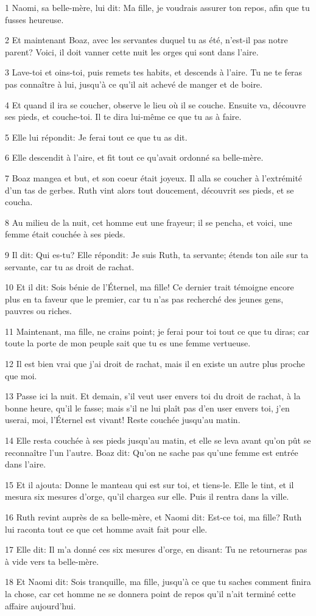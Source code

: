 \par 1 Naomi, sa belle-mère, lui dit: Ma fille, je voudrais assurer ton repos, afin que tu fusses heureuse.
\par 2 Et maintenant Boaz, avec les servantes duquel tu as été, n'est-il pas notre parent? Voici, il doit vanner cette nuit les orges qui sont dans l'aire.
\par 3 Lave-toi et oins-toi, puis remets tes habits, et descends à l'aire. Tu ne te feras pas connaître à lui, jusqu'à ce qu'il ait achevé de manger et de boire.
\par 4 Et quand il ira se coucher, observe le lieu où il se couche. Ensuite va, découvre ses pieds, et couche-toi. Il te dira lui-même ce que tu as à faire.
\par 5 Elle lui répondit: Je ferai tout ce que tu as dit.
\par 6 Elle descendit à l'aire, et fit tout ce qu'avait ordonné sa belle-mère.
\par 7 Boaz mangea et but, et son coeur était joyeux. Il alla se coucher à l'extrémité d'un tas de gerbes. Ruth vint alors tout doucement, découvrit ses pieds, et se coucha.
\par 8 Au milieu de la nuit, cet homme eut une frayeur; il se pencha, et voici, une femme était couchée à ses pieds.
\par 9 Il dit: Qui es-tu? Elle répondit: Je suis Ruth, ta servante; étends ton aile sur ta servante, car tu as droit de rachat.
\par 10 Et il dit: Sois bénie de l'Éternel, ma fille! Ce dernier trait témoigne encore plus en ta faveur que le premier, car tu n'as pas recherché des jeunes gens, pauvres ou riches.
\par 11 Maintenant, ma fille, ne crains point; je ferai pour toi tout ce que tu diras; car toute la porte de mon peuple sait que tu es une femme vertueuse.
\par 12 Il est bien vrai que j'ai droit de rachat, mais il en existe un autre plus proche que moi.
\par 13 Passe ici la nuit. Et demain, s'il veut user envers toi du droit de rachat, à la bonne heure, qu'il le fasse; mais s'il ne lui plaît pas d'en user envers toi, j'en userai, moi, l'Éternel est vivant! Reste couchée jusqu'au matin.
\par 14 Elle resta couchée à ses pieds jusqu'au matin, et elle se leva avant qu'on pût se reconnaître l'un l'autre. Boaz dit: Qu'on ne sache pas qu'une femme est entrée dans l'aire.
\par 15 Et il ajouta: Donne le manteau qui est sur toi, et tiens-le. Elle le tint, et il mesura six mesures d'orge, qu'il chargea sur elle. Puis il rentra dans la ville.
\par 16 Ruth revint auprès de sa belle-mère, et Naomi dit: Est-ce toi, ma fille? Ruth lui raconta tout ce que cet homme avait fait pour elle.
\par 17 Elle dit: Il m'a donné ces six mesures d'orge, en disant: Tu ne retourneras pas à vide vers ta belle-mère.
\par 18 Et Naomi dit: Sois tranquille, ma fille, jusqu'à ce que tu saches comment finira la chose, car cet homme ne se donnera point de repos qu'il n'ait terminé cette affaire aujourd'hui.

